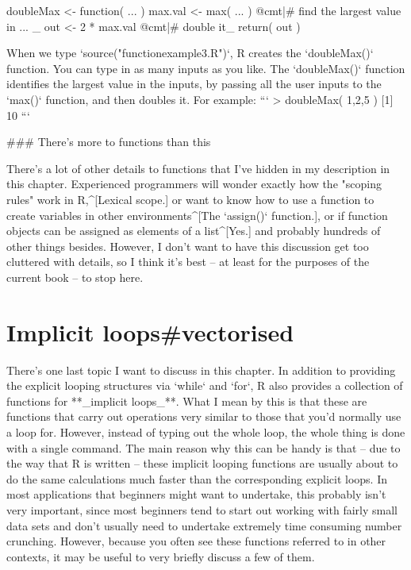 \begin{script}
doubleMax <- function( ... ) {  
  max.val <- max( ... )   @cmt|# find the largest value in ... _
  out <- 2 * max.val      @cmt|# double it_ 
  return( out )
}
\end{script}
When we type `source("functionexample3.R")`, R creates the `doubleMax()` function. You can type in as many inputs as you like. The `doubleMax()` function identifies the largest value in the inputs, by passing all the user inputs to the `max()` function, and then doubles it. For example:
```
> doubleMax( 1,2,5 )
[1] 10
```

### There's more to functions than this

There's a lot of other details to functions that I've hidden in my description in this chapter. Experienced programmers will wonder exactly how the "scoping rules" work in R,^[Lexical scope.] or want to know how to use a function to create variables in other environments^[The `assign()` function.], or if function objects can be assigned as elements of a list^[Yes.] and probably hundreds of other things besides. However, I don't want to have this discussion get too cluttered with details, so I think it's best -- at least for the purposes of the current book -- to stop here.





\section{Implicit loops{#vectorised}}

There's one last topic I want to discuss in this chapter. In addition to providing the explicit looping structures via `while` and `for`, R also provides a collection of functions for **_implicit loops_**. What I mean by this is that these are functions that carry out operations very similar to those that you'd normally use a loop for. However, instead of typing out the whole loop, the whole thing is done with a single command. The main reason why this can be handy is that -- due to the way that R is written -- these implicit looping functions are usually about to do the same calculations much faster than the corresponding explicit loops. In most applications that beginners might want to undertake, this probably isn't very important, since most beginners tend to start out working with fairly small data sets and don't usually need to undertake extremely time consuming number crunching. However, because you often see these functions referred to in other contexts, it may be useful to very briefly discuss a few of them.


